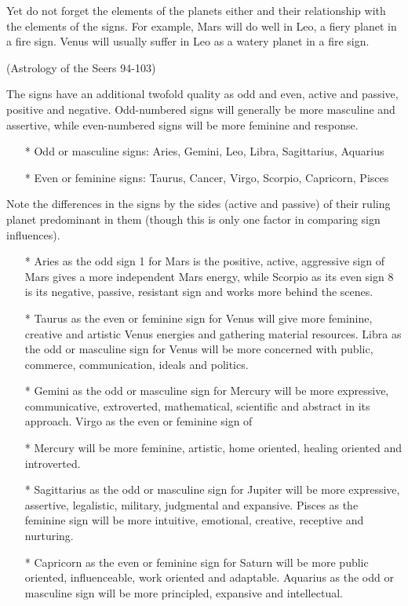 Yet do not forget the elements of the planets either and their relationship with the elements of the signs. For example, Mars will do well in Leo, a fiery planet in a fire sign. Venus will usually suffer in Leo as a watery planet in a fire sign.

 (Astrology of the Seers 94-103)

 

The signs have an additional twofold quality  as odd and even, active and passive, positive and negative. Odd-numbered signs will generally be more masculine and assertive, while even-numbered signs will be more feminine and response.

 


\begin{enumerate}
\item[*] Odd or masculine signs: Aries, Gemini, Leo, Libra, Sagittarius, Aquarius
\item[*] Even or feminine signs: Taurus, Cancer, Virgo, Scorpio, Capricorn, Pisces
    \end{enumerate}

Note the differences in the signs by the sides (active and passive) of their ruling planet predominant in them (though this is only one factor in comparing sign influences).

\begin{enumerate}
\item[*] Aries as the odd sign 1 for Mars is the positive, active, aggressive sign of Mars gives a more independent Mars energy, while Scorpio as its even sign 8 is its negative, passive, resistant sign and works more behind the scenes.
\item[*] Taurus as the even or feminine sign for Venus will give more feminine, creative and artistic Venus energies and gathering material resources. Libra as the odd or masculine sign for Venus will be more concerned with public, commerce, communication, ideals and politics.
\item[*] Gemini as the odd or masculine sign for Mercury will be more expressive, communicative, extroverted, mathematical, scientific and abstract in its approach. Virgo as the even or feminine sign of \item[*] Mercury will be more feminine, artistic, home oriented, healing oriented and introverted.
\item[*] Sagittarius as the odd or masculine sign for Jupiter will be more expressive, assertive, legalistic, military, judgmental and expansive. Pisces as the feminine sign will be more intuitive, emotional, creative, receptive and nurturing.
\item[*] Capricorn as the even or feminine sign for Saturn will be more public oriented, influenceable, work oriented and adaptable. Aquarius as the odd or masculine sign will be more principled, expansive and intellectual.
   \end{enumerate}

